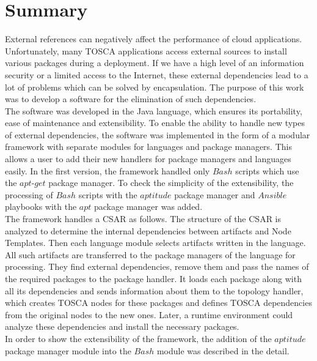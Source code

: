 
\chapter{Summary}\label{chap:zusfas}
External references can negatively affect the performance of cloud applications.
Unfortunately, many TOSCA applications access external sources to install various packages during a deployment.
If we have a high level of an information security or a limited access to the Internet, these external dependencies lead to a lot of problems which can be solved by encapsulation.
The purpose of this work was to develop a software for the elimination of such dependencies.\\
The software was developed in the Java language, which ensures its portability, ease of maintenance and extensibility.
To enable the ability to handle new types of external dependencies, the software was implemented in the form of a modular framework with separate modules for languages and package managers.
This allows a user to add their new handlers for package managers and languages easily.
In the first version, the framework handled only $Bash$ scripts  which use the $apt$-$get$ package manager.
To check the simplicity of the extensibility, the processing of $Bash$ scripts with the $aptitude$ package manager and  $Ansible$ playbooks with the $apt$ package manager was added.\\
The framework handles a CSAR as follows.
The structure of the CSAR is analyzed to determine the internal dependencies between artifacts and Node Templates.
Then each language module selects artifacts written in the language.
All such artifacts are transferred to the package managers of the language for processing.
They find external dependencies, remove them and pass the names of the required packages to the package handler.
It loads each package along with all its dependencies and sends information about them to the topology handler, which creates TOSCA nodes for these packages and defines TOSCA dependencies from the original nodes to the new ones.
Later, a runtime environment could analyze these dependencies and install the necessary packages.\\
In order to show the extensibility of the framework, the addition of the $aptitude$ package manager module into the $Bash$ module was described in the detail.
